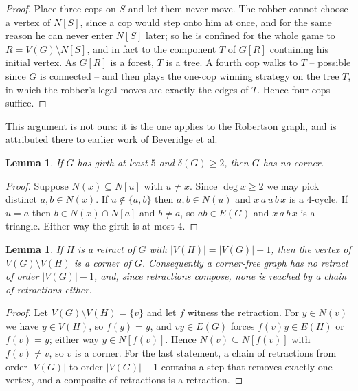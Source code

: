 \documentclass[11pt]{amsart}
\newtheorem{lemma}[theorem]{Lemma}
\theoremstyle{remark}
\begin{document}
\begin{proof}
Place three cops on $S$ and let them never move. The robber cannot choose a vertex of $N[S]$,
since a cop would step onto him at once, and for the same reason he can never enter $N[S]$
later; so he is confined for the whole game to $R=V(G)\setminus N[S]$, and in fact to the
component $T$ of $G[R]$ containing his initial vertex. As $G[R]$ is a forest, $T$ is a tree.
A fourth cop walks to $T$ -- possible since $G$ is connected -- and then plays the one-cop
winning strategy on the tree $T$, in which the robber's legal moves are exactly the edges of
$T$. Hence four cops suffice.
\end{proof}

This argument is not ours: it is the one \cite{TY} applies to the Robertson graph, and is
attributed there to earlier work of Beveridge et al.

\begin{lemma}\label{lem:cornerfree}
If $G$ has girth at least $5$ and $\delta(G)\ge2$, then $G$ has no corner.
\end{lemma}

\begin{proof}
Suppose $N(x)\subseteq N[u]$ with $u\ne x$. Since $\deg x\ge2$ we may pick distinct
$a,b\in N(x)$. If $u\notin\{a,b\}$ then $a,b\in N(u)$ and $x\,a\,u\,b\,x$ is a $4$-cycle. If
$u=a$ then $b\in N(x)\cap N[a]$ and $b\ne a$, so $ab\in E(G)$ and $x\,a\,b\,x$ is a triangle.
Either way the girth is at most $4$.
\end{proof}

\begin{lemma}\label{lem:retract}
If $H$ is a retract of $G$ with $|V(H)|=|V(G)|-1$, then the vertex of
$V(G)\setminus V(H)$ is a corner of $G$. Consequently a corner-free graph has no retract of
order $|V(G)|-1$, and, since retractions compose, none is reached by a chain of retractions
either.
\end{lemma}

\begin{proof}
Let $V(G)\setminus V(H)=\{v\}$ and let $f$ witness the retraction. For $y\in N(v)$ we have
$y\in V(H)$, so $f(y)=y$, and $vy\in E(G)$ forces $f(v)y\in E(H)$ or $f(v)=y$; either way
$y\in N[f(v)]$. Hence $N(v)\subseteq N[f(v)]$ with $f(v)\ne v$, so $v$ is a corner. For the
last statement, a chain of retractions from order $|V(G)|$ to order $|V(G)|-1$ contains a step
that removes exactly one vertex, and a composite of retractions is a retraction.
\end{proof}
\end{document}

